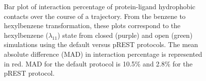 \setcounter{figure}{0} 
\begin{figure}[!htb]
\begin{subfigure}{\textwidth}
   \centering
\end{subfigure}
\centering
\begin{subfigure}{\textwidth}
  \centering
\end{subfigure}
\caption{Bar plot of interaction percentage of protein-ligand hydrophobic contacts over the course of a trajectory. 
From the benzene to hexylbenzene transformation, these plots correspond to the hexylbenzene ($\lambda_{11}$) state from closed (purple) and open (green) simulations using the default versus pREST protocols.
The mean absolute difference (MAD) in interaction percentage is represented in red.
MAD for the default protocol is 10.5\% and 2.8\% for the pREST protocol.
}
\label{fig:contactmap}
\end{figure}

